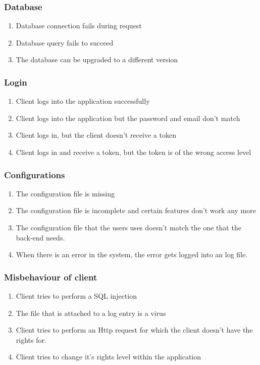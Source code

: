 \subsubsection{Database}
\begin{enumerate}
\item Database connection fails during request
\item Database query fails to succeed 
\item The database can be upgraded to a different version 
\end{enumerate}



\subsubsection{Login}
\begin{enumerate}
\item Client logs into the application successfully
\item Client logs into the application but the password and email don't match
\item Client logs in, but the client doesn't receive a token
\item Client logs in and receive a token, but the token is of the wrong access level
\end{enumerate}

\subsubsection{Configurations}
\begin{enumerate}
\item The configuration file is missing
\item The configuration file is incomplete and certain features don't work any more
\item The configuration file that the users uses doesn't match the one that the back-end needs.
\item When there is an error in the system, the error gets logged into an log file.
\end{enumerate}

\subsubsection{Misbehaviour of client}
\begin{enumerate}
\item Client tries to perform a SQL injection
\item The file that is attached to a log entry is a virus
\item Client tries to perform an Http request for which the client doesn't have the rights for.
\item Client tries to change it's rights level within the application

\end{enumerate}

